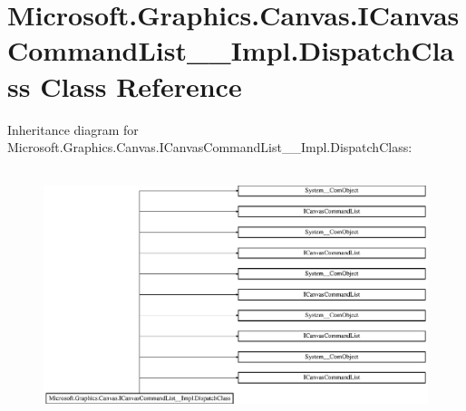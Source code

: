 \hypertarget{class_microsoft_1_1_graphics_1_1_canvas_1_1_i_canvas_command_list_____impl_1_1_dispatch_class}{}\section{Microsoft.\+Graphics.\+Canvas.\+I\+Canvas\+Command\+List\+\_\+\+\_\+\+Impl.\+Dispatch\+Class Class Reference}
\label{class_microsoft_1_1_graphics_1_1_canvas_1_1_i_canvas_command_list_____impl_1_1_dispatch_class}
Inheritance diagram for Microsoft.\+Graphics.\+Canvas.\+I\+Canvas\+Command\+List\+\_\+\+\_\+\+Impl.\+Dispatch\+Class\+:\begin{figure}[H]
\begin{center}
\leavevmode
\includegraphics[height=7.350835cm]{class_microsoft_1_1_graphics_1_1_canvas_1_1_i_canvas_command_list_____impl_1_1_dispatch_class}
\end{center}
\end{figure}
